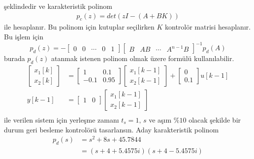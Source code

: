 şeklindedir ve karakteristik polinom
\begin{equation}
    \begin{split}
        p_c(z)=det(zI-(A+BK))
    \end{split}
\end{equation}
ile hesaplanır. Bu polinom için kutuplar seçilirken $K$ kontrolör matrisi hesaplanır. Bu işlem için
\begin{equation}
    p_d(z)=-\begin{bmatrix}0& 0& \cdots& 0& 1\end{bmatrix}\begin{bmatrix}B& AB& \cdots& A^{n-1}B\end{bmatrix}^{-1}p_d(A)
\end{equation}
burada $p_d(z)$ atanmak istenen polinom olmak üzere formülü kullanılabilir. 
\begin{equation}
    \begin{split}
\begin{bmatrix}
    x_1[k]\\
    x_2[k]
\end{bmatrix}&=
\begin{bmatrix}
    1& 0.1\\
    -0.1& 0.95
\end{bmatrix}\begin{bmatrix}
    x_1[k-1]\\
    x_2[k-1]
\end{bmatrix}+\begin{bmatrix}
    0\\
    0.1
\end{bmatrix}u[k-1]\\
y[k-1]&=\begin{bmatrix}
    1&0 
\end{bmatrix}\begin{bmatrix}
    x_1[k-1]\\
    x_2[k-1]
\end{bmatrix}\\
\end{split}
\end{equation}
ile verilen sistem için yerleşme zamanı $t_s=1,\,s$ ve aşım $\%10$ olacak şekilde bir durum geri besleme kontrolörü tasarlansın. Aday karakteristik polinom 
\begin{equation}
\begin{split}
    p_d(s)&=s^2+8s+45.7844\\
    &=(s+4 + 5.4575i)(s+4 - 5.4575i)
\end{split}
\end{equation}
